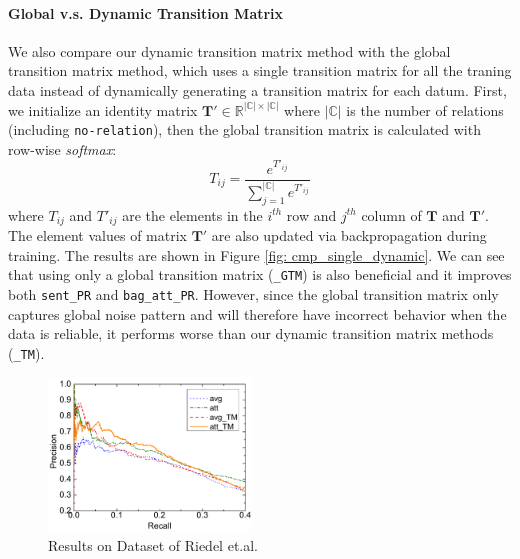 \paragraph{Global v.s. Dynamic Transition Matrix}
We also compare our dynamic transition matrix method with the global transition matrix method,
which uses a single transition matrix for all the traning data instead of dynamically generating a transition matrix for each datum.
First, we initialize an identity matrix $\mathbf{T}'\in\mathbb{R}^{|\mathbb{C}|\times |\mathbb{C}|}$ where $|\mathbb{C}|$ is the number of relations (including \texttt{no-relation}), then the global transition matrix is calculated with row-wise \emph{softmax}:
\begin{equation}
\label{shared_mat}
T_{ij} = \frac{e^{T'_{ij}}}{\sum_{j=1}^{|\mathbb{C}|}{e^{T'_{ij}}}}
\end{equation}
where $T_{ij}$ and $T'_{ij}$ are the elements in the $i^{th}$ row and $j^{th}$ column of $\mathbf{T}$ and $\mathbf{T}'$. The element values of matrix $\mathbf{T}'$ are also updated via backpropagation during training.
The results are shown in Figure \ref{fig: cmp_single_dynamic}.
We can see that using only a global transition matrix (\texttt{\_GTM}) is also beneficial and it improves both \texttt{sent\_PR} and \texttt{bag\_att\_PR}. However, since the global transition matrix only captures global noise pattern and will therefore have incorrect behavior when the data is reliable, it performs worse than our dynamic transition matrix methods (\texttt{\_TM}).

\begin{figure}[t!]
\includegraphics[width=0.48\textwidth]{figures/re_att_avg_cmp_exp.pdf}
\caption{Results on Dataset of Riedel et.al.}
\label{fig: Riedel_res}
\end{figure}

